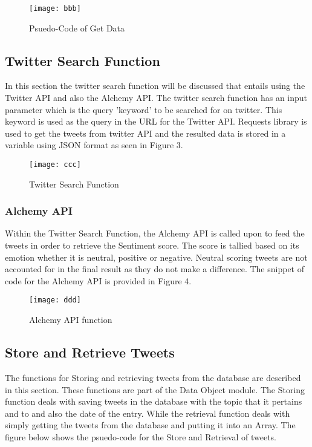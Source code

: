 \documentclass[12pt, titlepage]{article}
\begin{document}
\begin{figure}[H]
\centering
\texttt{[image: bbb]}
\caption{Psuedo-Code of Get Data}
\label{fig:GetData}
\end{figure}


\subsection{Twitter Search Function}
In this section the twitter search function will be discussed that entails using the Twitter API and also the Alchemy API. The twitter search function has an input parameter which is the query 'keyword' to be searched for on twitter. This keyword is used as the query in the URL for the Twitter API. Requests library is used to get the tweets from twitter API and the resulted data is stored in a variable using JSON format as seen in Figure 3. 

\begin{figure}[H]
\centering
\texttt{[image: ccc]}
\caption{Twitter Search Function}
\label{fig:TwitterSearch}
\end{figure}

\subsubsection{Alchemy API}
Within the Twitter Search Function, the Alchemy API is called upon to feed the tweets in order to retrieve the Sentiment score. The score is tallied based on its emotion whether it is neutral, positive or negative. Neutral scoring tweets are not accounted for in the final result as they do not make a difference. The snippet of code for the Alchemy API is provided in Figure 4.

\begin{figure}[H]
\centering
\texttt{[image: ddd]}
\caption{Alchemy API  function}
\label{fig:Alchemy}
\end{figure}

\subsection{Store and Retrieve Tweets}
The functions for Storing and retrieving tweets from the database are described in this section. These functions are part of the Data Object module. The Storing function deals with saving tweets in the database with the topic that it pertains and to and also the date of the entry. While the retrieval function deals with simply getting the tweets from the database and putting it into an Array. The figure below shows the psuedo-code for the Store and Retrieval of tweets.
\end{document}
